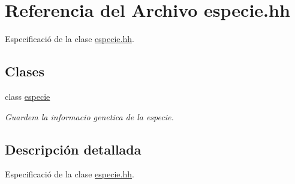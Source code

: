 \hypertarget{especie_8hh}{}\section{Referencia del Archivo especie.\+hh}
\label{especie_8hh}


Especificació de la clase \hyperlink{especie_8hh}{especie.\+hh}.  


\subsection*{Clases}
\begin{DoxyCompactItemize}
\item 
class \hyperlink{classespecie}{especie}
\begin{DoxyCompactList}\small\item\em Guardem la informacio genetica de la especie. \end{DoxyCompactList}\end{DoxyCompactItemize}


\subsection{Descripción detallada}
Especificació de la clase \hyperlink{especie_8hh}{especie.\+hh}. 

